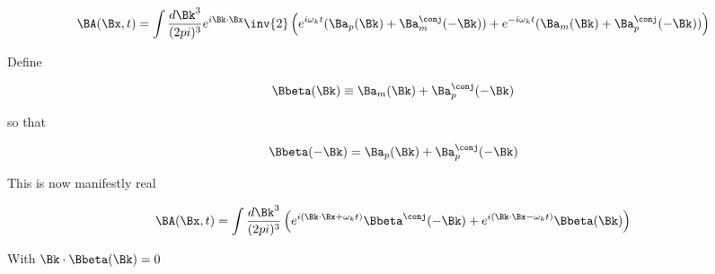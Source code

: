 \begin{equation}\label{eqn:relativisticElectrodynamicsL15:670}
\BA(\Bx, t) 
= \int \frac{d\Bk^3}{(2 pi)^3} e^{i \Bk \cdot \Bx} 
\inv{2} \left( 
e^{i \omega_k t} (\Ba_p(\Bk) + \Ba_m^\conj(-\Bk)) 
+e^{-i \omega_k t} (\Ba_m(\Bk) + \Ba_p^\conj(-\Bk)) 
\right)
\end{equation}

Define

\begin{equation}\label{eqn:relativisticElectrodynamicsL15:690}
\Bbeta(\Bk) \equiv \Ba_m(\Bk) + \Ba_p^\conj(-\Bk) 
\end{equation}

so that

\begin{equation}\label{eqn:relativisticElectrodynamicsL15:710}
\Bbeta(-\Bk) = \Ba_p(\Bk) + \Ba_p^\conj(-\Bk)
\end{equation}

This is now manifestly real

\begin{equation}\label{eqn:relativisticElectrodynamicsL15:730}
\BA(\Bx, t) = \int \frac{d\Bk^3}{(2 pi)^3} \left( 
e^{i (\Bk \cdot \Bx + \omega_k t)} \Bbeta^\conj(-\Bk)
+e^{i (\Bk \cdot \Bx - \omega_k t)} \Bbeta(\Bk)
\right)
\end{equation}

With $\Bk \cdot \Bbeta(\Bk)  = 0$

\EndArticle
